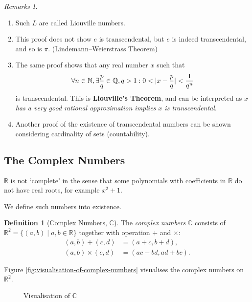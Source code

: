 \documentclass{article}
\theoremstyle{definition}
\newtheorem{definition}[theorem]{Definition}
\theoremstyle{remark}
\newtheorem{remarks}[theorem]{Remarks}
\DeclarePairedDelimiter{\abs}{\lvert}{\rvert}
\newcommand{\pqty}[1]{\left(#1\right)}
\newcommand{\set}[2]{\{#1\mid #2\}}
\newcommand{\NN}{\mathbb{N}}
\newcommand{\QQ}{\mathbb{Q}}
\newcommand{\RR}{\mathbb{R}}
\newcommand{\CC}{\mathbb{C}}
\begin{document}
\begin{remarks}
    \begin{enumerate}
        \item Such \(L\) are called Liouville numbers.
        \item This proof does not show \(e\) is transcendental, but \(e\) is indeed transcendental, and so is \(\pi\). (Lindemann--Weierstrass Theorem)
        \item The same proof shows that any real number \(x\) such that
        \[
            \forall n \in \NN, \exists \frac{p}{q} \in \QQ, q > 1: 0 < \abs{x - \frac{p}{q}} < \frac{1}{q^n}
        \]
        is transcendental. This is \textbf{Liouville's Theorem}, and can be interpreted as \emph{\(x\) has a very good rational approximation implies \(x\) is transcendental}.
        \item Another proof of the existence of transcendental numbers can be shown considering cardinality of sets (countability).
    \end{enumerate}
\end{remarks}

\subsection{The Complex Numbers}
\label{sec:complex-numbers}

\(\RR\) is not `complete' in the sense that some polynomials with coefficients in \(\RR\) do not have real roots, for example \(x^2 + 1\).

We define such numbers into existence.

\begin{definition}[Complex Numbers, \(\CC\)]
    The \emph{complex numbers} \(\CC\) consists of \(\RR^2 = \set{\pqty{a, b}}{a, b \in \RR}\) together with operation \(+\) and \(\times\):
    \begin{align*}
        \pqty{a, b} + \pqty{c, d} &= \pqty{a + c, b + d}, \\
        \pqty{a, b} \times \pqty{c, d} &= \pqty{ac - bd, ad + bc}.
    \end{align*}
\end{definition}

Figure \autoref{fig:visualisation-of-complex-numbers} visualises the complex numbers on \(\RR^2\).

\begin{figure}[ht!]
    \centering
    \caption{Visualisation of \(\CC\)}
    \label{fig:visualisation-of-complex-numbers}
\end{figure}
\end{document}
